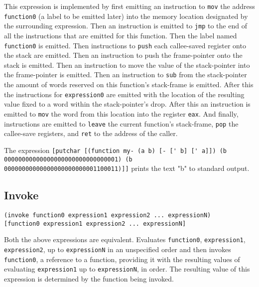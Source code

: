 \documentclass[twocolumn,landscape]{article}
\begin{document}
      This expression is implemented by first emitting an instruction to \lstinline{mov} the address \lstinline{function0} (a label to be emitted later) into the memory location designated by the surrounding expression. Then an instruction is emitted to \lstinline{jmp} to the end of all the instructions that are emitted for this function. Then the label named \lstinline{function0} is emitted. Then instructions to \lstinline{push} each callee-saved register onto the stack are emitted. Then an instruction to push the frame-pointer onto the stack is emitted. Then an instruction to move the value of the stack-pointer into the frame-pointer is emitted. Then an instruction to \lstinline{sub} from the stack-pointer the amount of words reserved on this function's stack-frame is emitted. After this the instructions for \lstinline{expression0} are emitted with the location of the resulting value fixed to a word within the stack-pointer's drop. After this an instruction is emitted to \lstinline{mov} the word from this location into the register \lstinline{eax}. And finally, instructions are emitted to \lstinline{leave} the current function's stack-frame, \lstinline{pop} the callee-save registers, and \lstinline{ret} to the address of the caller.

      The expression \lstinline{[putchar [(function my- (a b) [- [' b] [' a]]) (b 00000000000000000000000000000001) (b 00000000000000000000000001100011)]]} prints the text "b" to standard output.

    \subsection{Invoke}\label{sec:invoke}
      \begin{lstlisting}
(invoke function0 expression1 expression2 ... expressionN)
[function0 expression1 expression2 ... expressionN]
      \end{lstlisting}
      Both the above expressions are equivalent. Evaluates \lstinline{function0}, \lstinline{expression1}, \lstinline{expression2}, up to \lstinline{expressionN} in an unspecified order and then invokes \lstinline{function0}, a reference to a function, providing it with the resulting values of evaluating \lstinline{expression1} up to \lstinline{expressionN}, in order. The resulting value of this expression is determined by the function being invoked.
\end{document}
